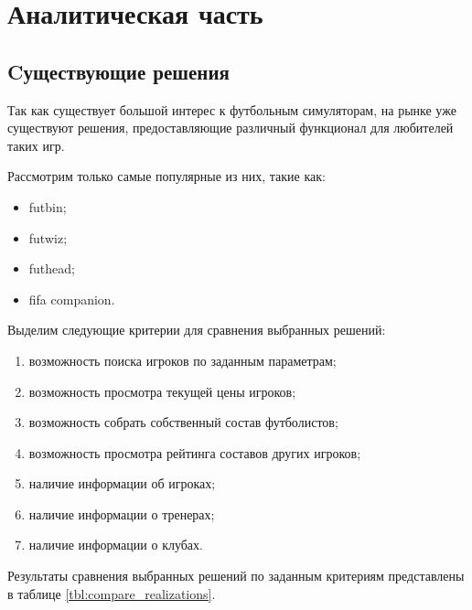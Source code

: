 \chapter{Аналитическая часть}

\section{Cуществующие решения}

Так как существует большой интерес к футбольным симуляторам, на рынке уже существуют решения, предоставляющие различный функционал для любителей таких игр.

Рассмотрим только самые популярные из них, такие как:

\begin{itemize}
	\item futbin;
	\item futwiz;
	\item futhead;
	\item fifa companion.
\end{itemize}

Выделим следующие критерии для сравнения выбранных решений:

\begin{enumerate}
	\item возможность поиска игроков по заданным параметрам;
	\item возможность просмотра текущей цены игроков;
	\item возможность собрать собственный состав футболистов;
	\item возможность просмотра рейтинга составов других игроков;
	\item наличие информации об игроках;
	\item наличие информации о тренерах;
	\item наличие информации о клубах.
\end{enumerate}

\clearpage

Результаты сравнения выбранных решений по заданным критериям представлены в таблице \ref{tbl:compare_realizations}.

